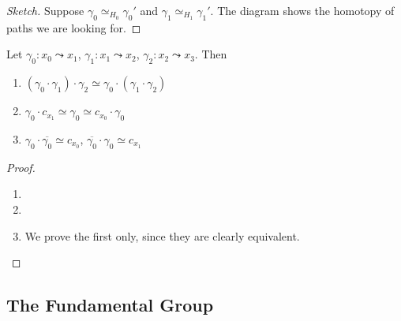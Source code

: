 \documentclass{article}
\numberwithin{nthm}{subsection}
\begin{document}
\begin{proof}[Sketch]
    Suppose $\gamma_0 \simeq_{H_0} \gamma_0'$ and $\gamma_1 \simeq_{H_1} \gamma_1'$.
    The diagram shows the homotopy of paths we are looking for.
\end{proof}

\begin{nprop}
    Let $\gamma_0:x_0 \leadsto x_1$, $\gamma_1: x_1 \leadsto x_2$, $\gamma_2: x_2 \leadsto x_3$.
    Then
    \begin{enumerate}[label=(\roman*)]
        \item $(\gamma_0 \cdot \gamma_1) \cdot \gamma_2 \simeq \gamma_0 \cdot (\gamma_1 \cdot \gamma_2)$
        \item $\gamma_0 \cdot c_{x_1} \simeq \gamma_0 \simeq c_{x_0} \cdot \gamma_0$
        \item $\gamma_0 \cdot \overline{\gamma_0} \simeq c_{x_0}$, $\overline{\gamma_0} \cdot \gamma_0 \simeq c_{x_1}$
    \end{enumerate}
\end{nprop}

\begin{proof}
    \leavevmode
    \begin{enumerate}[label=(\roman*)]
        \item

        \item
        \item We prove the first only, since they are clearly equivalent.
    \end{enumerate}
\end{proof}

\subsection{The Fundamental Group}
\end{document}

